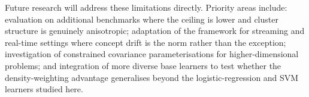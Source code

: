 \documentclass[lettersize,journal]{IEEEtran}
\begin{document}
	Future research will address these limitations directly. Priority areas include: evaluation on additional benchmarks where the ceiling is lower and cluster structure is genuinely anisotropic; adaptation of the framework for streaming and real-time settings where concept drift is the norm rather than the exception; investigation of constrained covariance parameterisations for higher-dimensional problems; and integration of more diverse base learners to test whether the density-weighting advantage generalises beyond the logistic-regression and SVM learners studied here.
	
	
	
	
\end{document}
